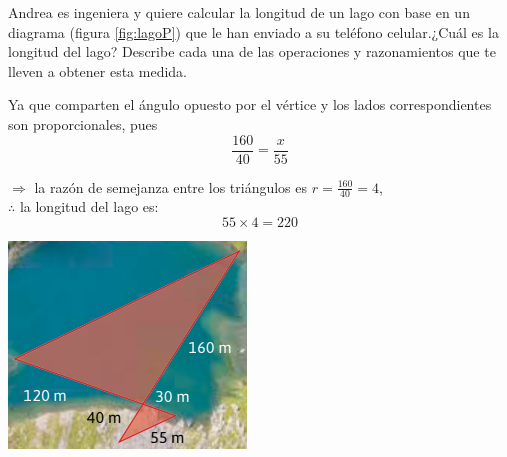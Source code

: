 \question[20] Andrea es ingeniera y quiere calcular la longitud de un lago con base en un diagrama (figura \ref{fig:lagoP}) que le han
enviado a su teléfono celular.¿Cuál es la longitud del lago? Describe cada una de las
operaciones y razonamientos que te lleven a obtener esta medida.

\begin{minipage}{0.4\linewidth}
    \begin{solutionbox}{8cm}
        Ya que comparten el ángulo opuesto por el vértice y los lados correspondientes son proporcionales, pues
        \[\frac{160}{40} = \frac{x}{55}\]

        $\Rightarrow$ la raz\'on de semejanza entre los tri\'angulos es $r=\frac{160}{40}=4$,\\

        $\therefore$ la longitud del lago es:
        \[
            55 \times 4  =220
        \]
    \end{solutionbox}
\end{minipage}\hfill
\begin{minipage}{0.5\linewidth}
    \captionsetup{width=1.2\linewidth}
    \includegraphics{Images/lagoP}
    \label{fig:lagoP}
\end{minipage}
